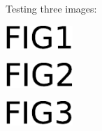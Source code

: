 \documentclass[leqno]{amsart}
\begin{document}
Testing three images:

\begin{center}
  \includegraphics[width=1in]{fig1.pdf}
\end{center}

\begin{center}
  \includegraphics[width=1in]{fig2}
\end{center}

\begin{center}
  \includegraphics[width=1in]{./figs3/fig3}
\end{center}


\end{document}
